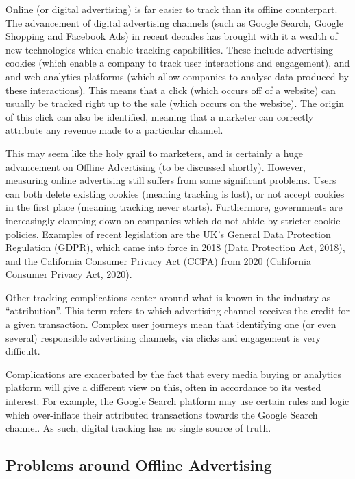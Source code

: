 \documentclass[11pt, a4paper]{article}
\begin{document}
Online (or digital advertising) is far easier to track than its offline counterpart. The advancement of digital advertising channels (such as Google Search, Google Shopping and Facebook Ads) in recent decades has brought with it a wealth of new technologies which enable tracking capabilities. These include advertising cookies (which enable a company to track user interactions and engagement), and 
and web-analytics platforms (which allow companies to analyse data produced by these interactions). This means that a click (which occurs off of a website) can usually be tracked right up to the sale (which occurs on the website). The origin of this click can also be identified, meaning that a marketer can correctly attribute any revenue made to a particular channel. \par

This may seem like the holy grail to marketers, and is certainly a huge advancement on Offline Advertising (to be discussed shortly). However, measuring online advertising still suffers from some significant problems. Users can both delete existing cookies (meaning tracking is lost), or not accept cookies in the first place (meaning tracking never starts). Furthermore, governments are increasingly clamping down on companies which do not abide by stricter cookie policies. Examples of recent legislation are the UK’s General Data Protection Regulation (GDPR), which came into force in 2018 (Data Protection Act, 2018), and the California Consumer Privacy Act (CCPA) from 2020 (California Consumer Privacy Act, 2020).\par

Other tracking complications center around what is known in the industry as “attribution”. This term refers to which advertising channel receives the credit for a given transaction. Complex user journeys mean that identifying one (or even several) responsible advertising channels, via clicks and engagement is very difficult.

Complications are exacerbated by the fact that every media buying or analytics platform will give a different view on this, often in accordance to its vested interest. For example, the Google Search platform may use certain rules and logic which over-inflate their attributed transactions towards the Google Search channel. As such, digital tracking has no single source of truth.\\

\subsection{Problems around Offline Advertising}
\end{document}
